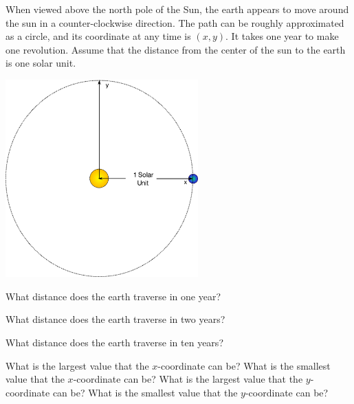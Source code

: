 
\begin{problem}
\item When viewed above the north pole of the Sun, the earth appears
  to move around the sun in a counter-clockwise direction. The path
  can be roughly approximated as a circle, and its coordinate at any
  time is $(x,y)$. It takes one year to make one revolution. Assume
  that the distance from the center of the sun to the earth is one
  solar unit.

  \begin{center}
    \includegraphics[width=20em]{angles/img/simpleSolarSystem}
  \end{center}

  \begin{subproblem}
  \item What distance does the earth traverse in one year?
    \vfill
  \item What distance does the earth traverse in two years?
    \vfill
  \item What distance does the earth traverse in ten years?
    \vfill
  \item What is the largest value that the $x$-coordinate can be?
    What is the smallest value that the $x$-coordinate can be?
    What is the largest value that the $y$-coordinate can be?
    What is the smallest value that the $y$-coordinate can be?
    \vfill
  \end{subproblem}

\end{problem}


